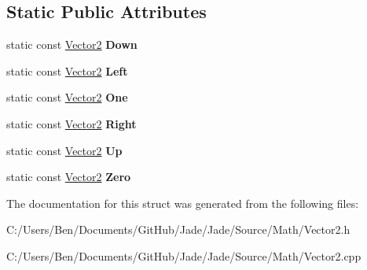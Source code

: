 \subsection*{Static Public Attributes}
\begin{DoxyCompactItemize}
\item 
\hypertarget{struct_jade_1_1_math_1_1_vector2_add163b90ccb8a6255d9bd7c20e4a426c}{}static const \hyperlink{struct_jade_1_1_math_1_1_vector2}{Vector2} {\bfseries Down}\label{struct_jade_1_1_math_1_1_vector2_add163b90ccb8a6255d9bd7c20e4a426c}

\item 
\hypertarget{struct_jade_1_1_math_1_1_vector2_a8a645aaf743645056a27309ee49515a1}{}static const \hyperlink{struct_jade_1_1_math_1_1_vector2}{Vector2} {\bfseries Left}\label{struct_jade_1_1_math_1_1_vector2_a8a645aaf743645056a27309ee49515a1}

\item 
\hypertarget{struct_jade_1_1_math_1_1_vector2_aec8b24e684ef64b72444a0173b3435b4}{}static const \hyperlink{struct_jade_1_1_math_1_1_vector2}{Vector2} {\bfseries One}\label{struct_jade_1_1_math_1_1_vector2_aec8b24e684ef64b72444a0173b3435b4}

\item 
\hypertarget{struct_jade_1_1_math_1_1_vector2_a42139904b7317b4c74c1cfd7bffbdf0d}{}static const \hyperlink{struct_jade_1_1_math_1_1_vector2}{Vector2} {\bfseries Right}\label{struct_jade_1_1_math_1_1_vector2_a42139904b7317b4c74c1cfd7bffbdf0d}

\item 
\hypertarget{struct_jade_1_1_math_1_1_vector2_ab43644c17e4dc580769b4c69b9f45f92}{}static const \hyperlink{struct_jade_1_1_math_1_1_vector2}{Vector2} {\bfseries Up}\label{struct_jade_1_1_math_1_1_vector2_ab43644c17e4dc580769b4c69b9f45f92}

\item 
\hypertarget{struct_jade_1_1_math_1_1_vector2_ab73d810cfab48e00e809cfed7d0dedcd}{}static const \hyperlink{struct_jade_1_1_math_1_1_vector2}{Vector2} {\bfseries Zero}\label{struct_jade_1_1_math_1_1_vector2_ab73d810cfab48e00e809cfed7d0dedcd}

\end{DoxyCompactItemize}


The documentation for this struct was generated from the following files\+:\begin{DoxyCompactItemize}
\item 
C\+:/\+Users/\+Ben/\+Documents/\+Git\+Hub/\+Jade/\+Jade/\+Source/\+Math/Vector2.\+h\item 
C\+:/\+Users/\+Ben/\+Documents/\+Git\+Hub/\+Jade/\+Jade/\+Source/\+Math/Vector2.\+cpp\end{DoxyCompactItemize}
